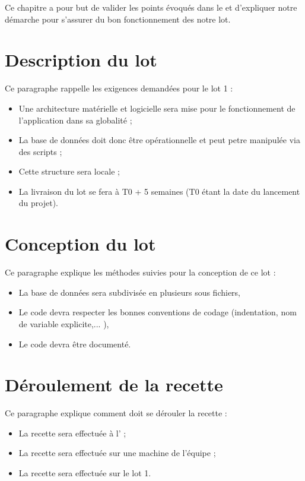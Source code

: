 	Ce chapitre a pour but de valider les points évoqués dans le \DSE{} et d'expliquer notre démarche pour s'assurer du bon fonctionnement des notre lot.
	
\section{Description du lot}
	Ce paragraphe rappelle les exigences demandées pour le lot 1 :
	\begin{itemize}
		\item Une architecture matérielle et logicielle sera mise pour le fonctionnement de l'application dans sa globalité ;
		\item La base de données doit donc être opérationnelle et peut petre manipulée via des scripts ;
		\item Cette structure sera locale ;
		\item La livraison du lot se fera à T0 + 5 semaines (T0 étant la date du lancement du projet).
	\end{itemize}
	
\section{Conception du lot}
	Ce paragraphe explique les méthodes suivies pour la conception de ce lot :
	\begin{itemize}
		\item La base de données sera subdivisée en plusieurs sous fichiers,
		\item Le code devra respecter les bonnes conventions de codage (indentation, nom de variable explicite,... ),
		\item Le code devra être documenté.
	\end{itemize}
	
\section{Déroulement de la recette}
	Ce paragraphe explique comment doit se dérouler la recette : 
	\begin{itemize}
		\item La recette sera effectuée à l'\INSA{} ;
		\item La recette sera effectuée sur une machine de l'équipe \nomEquipe{} ;
		\item La recette sera effectuée sur le lot 1.
	\end{itemize}

